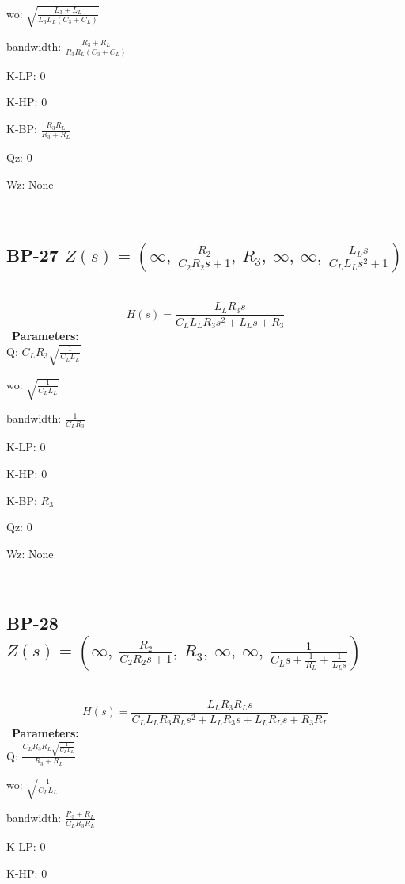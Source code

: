 \documentclass{article}
\begin{document}
wo: $\sqrt{\frac{L_{3} + L_{L}}{L_{3} L_{L} \left(C_{3} + C_{L}\right)}}$\ 

bandwidth: $\frac{R_{3} + R_{L}}{R_{3} R_{L} \left(C_{3} + C_{L}\right)}$\ 

K-LP: $0$\ 

K-HP: $0$\ 

K-BP: $\frac{R_{3} R_{L}}{R_{3} + R_{L}}$\ 

Qz: $0$\ 

Wz: $\text{None}$\ 

\ 

\subsection{BP-27 $Z(s) = \left( \infty, \  \frac{R_{2}}{C_{2} R_{2} s + 1}, \  R_{3}, \  \infty, \  \infty, \  \frac{L_{L} s}{C_{L} L_{L} s^{2} + 1}\right)$ } \ 
\textbf{\[H(s) = \frac{L_{L} R_{3} s}{C_{L} L_{L} R_{3} s^{2} + L_{L} s + R_{3}}\] } \ 
\textbf{Parameters:}\\ 

Q: $C_{L} R_{3} \sqrt{\frac{1}{C_{L} L_{L}}}$\ 

wo: $\sqrt{\frac{1}{C_{L} L_{L}}}$\ 

bandwidth: $\frac{1}{C_{L} R_{3}}$\ 

K-LP: $0$\ 

K-HP: $0$\ 

K-BP: $R_{3}$\ 

Qz: $0$\ 

Wz: $\text{None}$\ 

\ 

\subsection{BP-28 $Z(s) = \left( \infty, \  \frac{R_{2}}{C_{2} R_{2} s + 1}, \  R_{3}, \  \infty, \  \infty, \  \frac{1}{C_{L} s + \frac{1}{R_{L}} + \frac{1}{L_{L} s}}\right)$ } \ 
\textbf{\[H(s) = \frac{L_{L} R_{3} R_{L} s}{C_{L} L_{L} R_{3} R_{L} s^{2} + L_{L} R_{3} s + L_{L} R_{L} s + R_{3} R_{L}}\] } \ 
\textbf{Parameters:}\\ 

Q: $\frac{C_{L} R_{3} R_{L} \sqrt{\frac{1}{C_{L} L_{L}}}}{R_{3} + R_{L}}$\ 

wo: $\sqrt{\frac{1}{C_{L} L_{L}}}$\ 

bandwidth: $\frac{R_{3} + R_{L}}{C_{L} R_{3} R_{L}}$\ 

K-LP: $0$\ 

K-HP: $0$\ 
\end{document}
